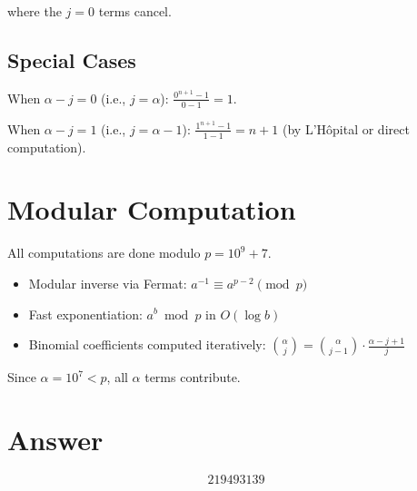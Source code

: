 \documentclass[12pt]{article}
\begin{document}
where the $j=0$ terms cancel.

\subsection{Special Cases}

When $\alpha - j = 0$ (i.e., $j = \alpha$): $\frac{0^{n+1}-1}{0-1} = 1$.

When $\alpha - j = 1$ (i.e., $j = \alpha - 1$): $\frac{1^{n+1}-1}{1-1} = n+1$ (by L'H\^opital or direct computation).

\section{Modular Computation}

All computations are done modulo $p = 10^9 + 7$.

\begin{itemize}
\item Modular inverse via Fermat: $a^{-1} \equiv a^{p-2} \pmod{p}$
\item Fast exponentiation: $a^b \bmod p$ in $O(\log b)$
\item Binomial coefficients computed iteratively: $\binom{\alpha}{j} = \binom{\alpha}{j-1} \cdot \frac{\alpha-j+1}{j}$
\end{itemize}

Since $\alpha = 10^7 < p$, all $\alpha$ terms contribute.

\section{Answer}

\[
\boxed{219493139}
\]
\end{document}
